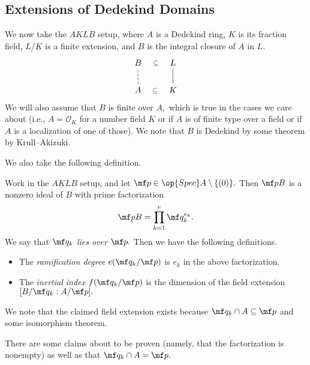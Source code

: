 \documentclass[../notes.tex]{subfiles}
\begin{document}
\subsection{Extensions of Dedekind Domains}
We now take the $AKLB$ setup, where $A$ is a Dedekind ring, $K$ is its fraction field, $L/K$ is a finite extension, and $B$ is the integral closure of $A$ in $L.$
\[\begin{tikzcd}
	B & L \\
	A & K
	\arrow[no head, from=2-2, to=1-2]
	\arrow[dashed, no head, from=2-1, to=1-1]
	\arrow["\subseteq"{description}, draw=none, from=1-1, to=1-2]
	\arrow["\subseteq"{description}, draw=none, from=2-1, to=2-2]
\end{tikzcd}\]
We will also assume that $B$ is finite over $A,$ which is true in the cases we care about (i.e., $A=\mathcal O_K$ for a number field $K$ or if $A$ is of finite type over a field or if $A$ is a localization of one of those). We note that $B$ is Dedekind by some theorem by Krull--Akizuki.

We also take the following definition.
\begin{definition}
    Work in the $AKLB$ setup, and let $\mf p\in\op{Spec}A\setminus\{(0)\}.$ Then $\mf pB$ is a nonzero ideal of $B$ with prime factorization
    \[\mf pB=\prod_{k=1}^r\mf q_k^{e_k}.\]
    We say that $\mf q_k$ \textit{lies over} $\mf p.$ Then we have the following definitions.
    \begin{itemize}
        \item The \textit{ramification degree} $e(\mf q_k/\mf p)$ is $e_k$ in the above factorization.
        \item The \textit{inertial index} $f(\mf q_k/\mf p)$ is the dimension of the field extension $[B/\mf q_k:A/\mf p].$
    \end{itemize}
    We note that the claimed field extension exists because $\mf q_k\cap A\subseteq\mf p$ and some isomorphism theorem.
\end{definition}
There are some claims about to be proven (namely, that the factorization is nonempty) as well as that $\mf q_k\cap A=\mf p.$
\end{document}
